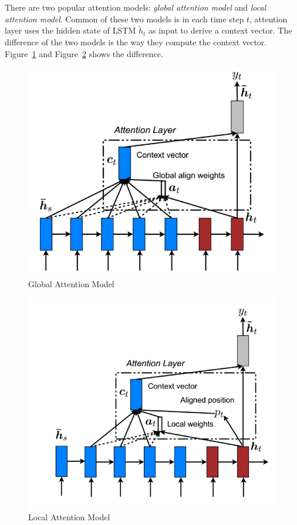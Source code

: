\documentclass[a4paper, 12pt]{article}
\begin{document}
There are two popular attention models: \textsl{global attention model} and \textsl{local attention model}. Common of these two models is in each time step $t$, attention layer uses the hidden state of LSTM $\tilde{h}_t$ as input to derive a context vector. The difference of the two models is the way they compute the context vector. Figure~\ref{fig:attention1} and Figure~\ref{fig:attention2}\cite{luong2015effective} shows the difference.

\begin{figure}[H]
\centering
\includegraphics[scale=0.5]{attention_1.png}
\caption{\label{fig:attention1}Global Attention Model}
\end{figure}

\begin{figure}[H]
\centering
\includegraphics[scale=0.5]{attention_2.png}
\caption{\label{fig:attention2}Local Attention Model}
\end{figure}
\end{document}
